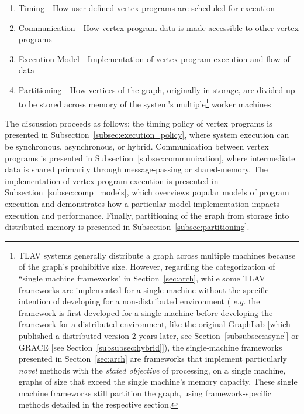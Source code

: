 \documentclass[reprint,twocolumn,showpacs,preprintnumbers,amsmath, aps,pre,amssymb]{revtex4-1}
\begin{document}
\begin{enumerate}
\item Timing - How user-defined vertex programs are scheduled for execution
\item Communication - How vertex program data is made accessible to other vertex programs
\item Execution Model - Implementation of vertex program execution and flow of data
\item Partitioning - How vertices of the graph, originally in storage, are divided up to be stored across memory of the system's multiple\footnote{TLAV systems generally distribute a graph across multiple machines because of the graph's prohibitive size.  However, regarding the categorization of ``single machine frameworks" in Section~\ref{sec:arch}, while some TLAV frameworks are implemented for a single machine without the specific intention of developing for a non-distributed environment ( {\em e.g.} the framework is first developed for a single machine before developing the framework for a distributed environment, like the original GraphLab [which published a distributed version 2 years later, see Section~\ref{subsubsec:async}] or GRACE [see Section~\ref{subsubsec:hybrid}]), the single-machine frameworks presented in Section~\ref{sec:arch} are frameworks that implement particularly \textit{novel} methods with the \textit{stated objective} of processing, on a single machine, graphs of size that exceed the single machine's memory capacity.  These single machine frameworks still partition the graph, using framework-specific methods detailed in the respective section.} worker machines
\end{enumerate}

The discussion proceeds as follows: the timing policy of vertex programs is presented in Subsection~\ref{subsec:execution_policy}, where system execution can be synchronous, asynchronous, or hybrid.  Communication between vertex programs is presented in Subsection~\ref{subsec:communication}, where intermediate data is shared primarily through message-passing or shared-memory.  The implementation of vertex program execution is presented in Subsection~\ref{subsec:comp_models}, which overviews popular models of program execution and demonstrates how a particular model implementation impacts execution and performance.  Finally, partitioning of the graph from storage into distributed memory is presented in Subsection~\ref{subsec:partitioning}.
\end{document}
